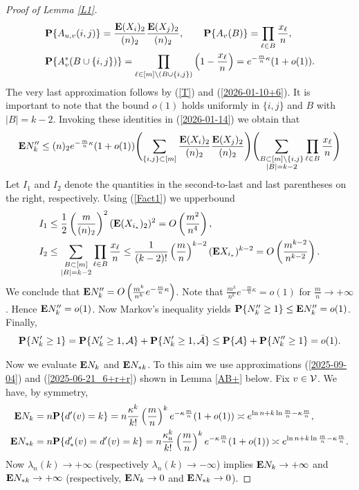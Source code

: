 \documentclass[11pt, a4paper]{article}
\newcommand{\E}{{\bf{E}}}
\newcommand{\PP}{{\bf{P}}}
\begin{document}
\begin{proof}[Proof of Lemma \ref{L1}]
\begin{align*}
&
\PP\{A_{u,v}(i,j)\}
=
\frac{\E(X_i)_2}{(n)_2}
\frac{\E(X_j)_2}{(n)_2},
\qquad
\PP\{A_v(B)\}
=
\prod_{\ell\in B}\frac{x_\ell}{n},
\\
&
\PP\{A^*_v(B\cup\{i,j\})\}
=
\prod_{\ell\in[m]\setminus(B\cup
\{i,j\})}
\left(1-\frac{x_\ell}{n}\right)
=
e^{-\frac{m}{n}\kappa}(1+o(1)).
\end{align*}
The very last approximation  follows by
(\ref{T}) 
and 
(\ref{2026-01-10+6}). It is important to note that the bound $o(1)$
holds uniformly in
$\{i,j\}$ and $B$ with $|B|=k-2$.
Invoking these identities in (\ref{2026-01-14}) we obtain that
\begin{align*}
\E N''_k
\le 
(n)_2
e^{-\frac{m}{n}\kappa}(1+o(1))
\Biggl(
\sum_{\{i,j\}\subset[m]}
\frac{\E(X_i)_2}{(n)_2}
\frac{\E(X_j)_2}{(n)_2}
\Biggr)
\Biggl(
\sum_{\substack{B\subset [m]\setminus\{i,j\}\\
|B|=k-2}}
\prod_{\ell\in B}\frac{x_\ell}{n}
\Biggr)
\end{align*}
Let $I_1$ and $I_2$ denote the quantities in the second-to-last and last parentheses on the right, respectively. Using (\ref{Fact1}) we upperbound  
\begin{align*}
I_1
&
\le 
\frac{1}{2}
\left(\frac{m}{(n)_2}\right)^2
(\E (X_{i_*})_2)^2
=
O\left(\frac{m^2}{n^4}\right),
\\
I_2
&
\le 
\sum_{\substack{B\subset [m]\\
|B|=k-2}}
\prod_{\ell\in B}\frac{x_\ell}{n}
\le
\frac{1}{(k-2)!}
\left(\frac{m}{n}\right)^{k-2}
(\E X_{i_*})^{k-2}
=
O\left(\frac{m^{k-2}}{n^{k-2}}\right).
\end{align*}
We conclude that 
$\E N''_k=O\left(\frac{m^k}{n^k}e^{-\frac{m}{n}\kappa}\right)$. Note that $\frac{m^k}{n^k}e^{-\frac{m}{n}\kappa}=o(1)$ for $\frac{m}{n}\to+\infty$.
Hence $\E N''_k=o(1)$. 
Now Markov's 
inequality yields 
$\PP\{N''_k\ge 1\}\le \E N''_k=o(1)$.
 Finally, 
\begin{align*}
\PP\{N'_k\ge 1\}
=
\PP\{N'_k\ge 1,{\cal A}\}
+
\PP\{N'_k\ge 1, {\bar{\cal A}}\}
\le
\PP\{{\cal A}\}
+
\PP\{N''_k\ge 1\}
=o(1).
\end{align*}



\medskip


Now we evaluate  $\E N_k$ and
$\E N_{*k}$. To  this aim we use approximations
(\ref{2025-09-04}) and
(\ref{2025-06-21_6+r+r}) shown in Lemma \ref{AB+} below. Fix $v\in{\cal V}$.  We have, by symmetry,
\begin{align*}
\E N_k
&
=
n\PP\{d'(v)=k\}
=
n 
\frac{\kappa^k}{k!}\left(\frac{m}{n}\right)^k 
e^{-\kappa\frac{m}{n}}
 (1+o(1))
\asymp
e^{\ln n+k\ln\frac{m}{n}-\kappa\frac{m}{n}},
\\
\E N_{*k}
&
=
n\PP\{d_*'(v)=d'(v)=k\}
=
n 
\frac{\kappa_a^k}{k!}\left(\frac{m}{n}\right)^k e^{-\kappa\frac{m}{n}}
 (1+o(1))
\asymp
e^{\ln n+k\ln\frac{m}{n}-\kappa\frac{m}{n}}.
\end{align*}
Now $\lambda_n(k)\to+\infty$ (respectively $\lambda_n(k)\to-\infty$)
implies $\E N_k\to+\infty$ and $\E N_{*k}\to+\infty$ 
(respectively,  $\E N_k\to 0$ and $\E N_{*k}\to 0$).


\end{proof}
\end{document}
